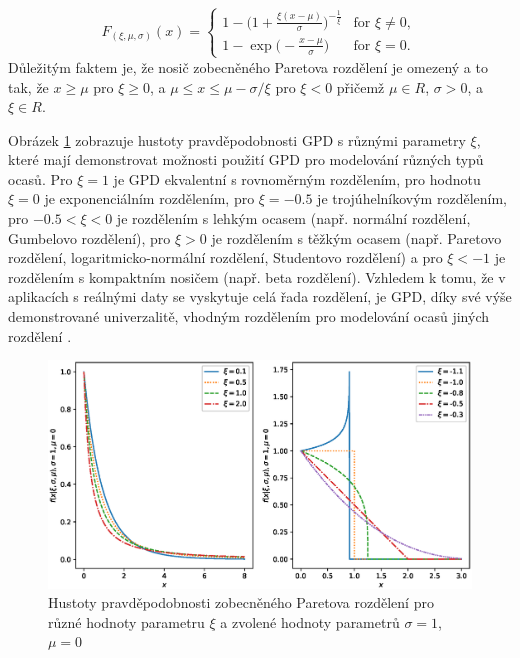 \begin{equation}
  F_{(\xi,\mu,\sigma)}(x)=\begin{cases}
    1 - \Bigg(1+\frac{\xi(x-\mu)}{\sigma}\Bigg)^{-\frac{1}{\xi}} & \text{for $\xi \neq 0$},\\
    1 - \exp{\Big(-\frac{x-\mu}{\sigma} \Big)} & \text{for $\xi = 0$}.
  \end{cases}
\end{equation}
Důležitým faktem je, že nosič zobecněného Paretova rozdělení je omezený a to tak, že $x \geq \mu$ pro $\xi \geq 0$, a $\mu \leq x \leq \mu - \sigma/\xi$ pro $\xi < 0$ přičemž $\mu \in R$, $\sigma > 0$, a $\xi \in R$.
\par
Obrázek \ref{fig:gpd_pdfs} zobrazuje hustoty pravděpodobnosti GPD s různými parametry $\xi$, které mají demonstrovat možnosti použití GPD pro modelování různých typů ocasů. Pro $\xi=1$ je GPD ekvalentní s rovnoměrným rozdělením, pro hodnotu $\xi=0$ je exponenciálním rozdělením, pro $\xi=-0.5$ je trojúhelníkovým rozdělením, pro $-0.5 < \xi < 0$ je rozdělením s lehkým ocasem (např. normální rozdělení, Gumbelovo rozdělení), pro $\xi > 0$ je rozdělením s těžkým ocasem (např. Paretovo rozdělení, logaritmicko-normální rozdělení, Studentovo rozdělení) a pro $\xi < -1$ je rozdělením s kompaktním nosičem (např. beta rozdělení). Vzhledem k tomu, že v aplikacích s reálnými daty se vyskytuje celá řada rozdělení, je GPD, díky své výše demonstrované univerzalitě, vhodným rozdělením pro modelování ocasů jiných rozdělení \cite{gpd1,gpd2,gpd3}.

\begin{figure}
    \centering
    \includegraphics[scale=0.68]{IMG/MDPI/pdfs.eps}
    \caption{Hustoty pravděpodobnosti zobecněného Paretova rozdělení pro různé hodnoty parametru $\xi$ a zvolené hodnoty parametrů $\sigma=1$, $\mu=0$}
    \label{fig:gpd_pdfs}
\end{figure}






